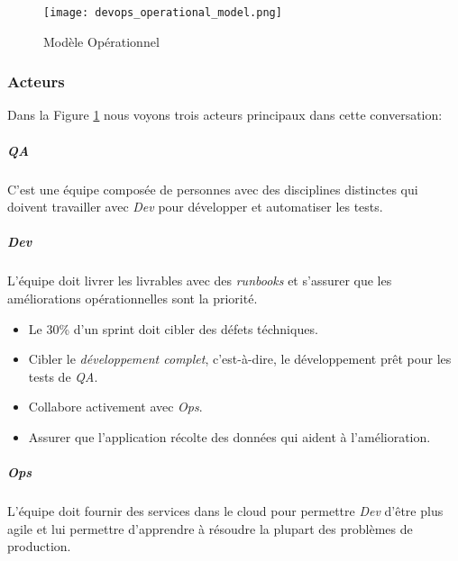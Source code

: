 \begin{figure}[!ht]
\centering
\texttt{[image: devops\_operational\_model.png]}
\caption{Modèle Opérationnel \cite{IsaacSacolick2016DrivingCulture}}
\label{fig:devops_operational_model}
\end{figure}


\subsubsection{Acteurs}
Dans la Figure \ref{fig:devops_operational_model} nous voyons trois acteurs principaux dans cette conversation:

\subparagraph{QA}
C'est une équipe composée de personnes avec des disciplines distinctes qui doivent travailler avec \textit{Dev} pour développer et automatiser les tests.
\subparagraph{Dev} L'équipe doit livrer les livrables avec des \emph{runbooks} et s’assurer que les améliorations opérationnelles sont la priorité.
\begin{itemize}
  \item Le 30\% d'un sprint doit cibler des défets téchniques.
  \item Cibler le \emph{développement complet}, c'est-à-dire, le développement prêt pour les tests de \textit{QA}.
  \item Collabore activement avec \textit{Ops}.
  \item Assurer que l'application récolte des données qui aident à l'amélioration.
\end{itemize}
\subparagraph{Ops}
L'équipe doit fournir des services dans le cloud pour permettre \textit{Dev} d’être plus agile et lui permettre d'apprendre à résoudre la plupart des problèmes de production.
